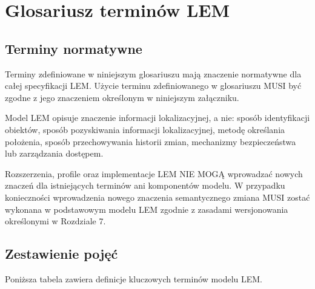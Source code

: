
\appendix
\chapter{Glosariusz terminów LEM}
\label{app:glosariusz}

\section{Terminy normatywne}
Terminy zdefiniowane w niniejszym glosariuszu mają znaczenie normatywne dla całej specyfikacji LEM. Użycie terminu zdefiniowanego w glosariuszu MUSI być zgodne z jego znaczeniem określonym w niniejszym załączniku.

Model LEM opisuje znaczenie informacji lokalizacyjnej, a nie: sposób identyfikacji obiektów, sposób pozyskiwania informacji lokalizacyjnej, metodę określania położenia, sposób przechowywania historii zmian, mechanizmy bezpieczeństwa lub zarządzania dostępem.

Rozszerzenia, profile oraz implementacje LEM NIE MOGĄ wprowadzać nowych znaczeń dla istniejących terminów ani komponentów modelu. W przypadku konieczności wprowadzenia nowego znaczenia semantycznego zmiana MUSI zostać wykonana w podstawowym modelu LEM zgodnie z zasadami wersjonowania określonymi w Rozdziale 7.

\section{Zestawienie pojęć}
Poniższa tabela zawiera definicje kluczowych terminów modelu LEM.

